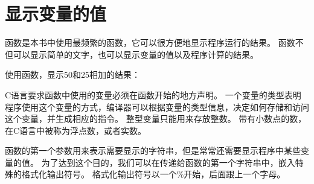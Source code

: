 \section{显示变量的值}
{
    函数是本书中使用最频繁的函数，它可以很方便地显示程序运行的结果。
    函数不但可以显示简单的文字，也可以显示变量的值以及程序计算的结果。

    使用函数，显示50和25相加的结果：

    \begin{codelist}
        
    \end{codelist}

    C语言要求函数中使用的变量必须在函数开始的地方声明。
    一个变量的类型表明程序使用这个变量的方式，编译器可以根据变量的类型信息，决定如何存储和访问这个变量，并生成相应的指令。
    整型变量只能用来存放整数。
    带有小数点的数，在C语言中被称为浮点数，或者实数。

    函数的第一个参数用来表示需要显示的字符串，但是常常还需要显示程序中某些变量的值。
    为了达到这个目的，我们可以在传递给函数的第一个字符串中，嵌入特殊的格式化输出符号。
    格式化输出符号以一个\%开始，后面跟上一个字母。
}

\endinput
